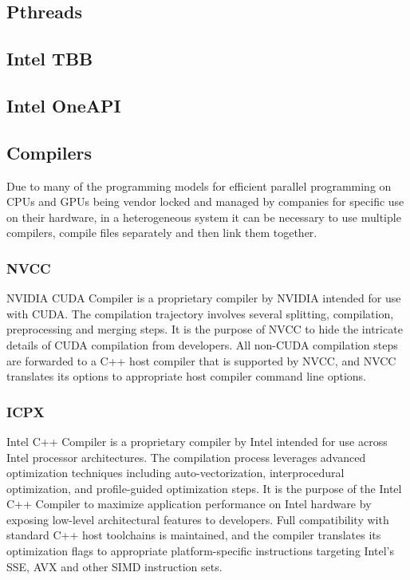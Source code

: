 \documentclass[12pt,a4paper]{article}
\begin{document}
\subsection{Pthreads}

\subsection{Intel TBB}


\subsection{Intel OneAPI}


\subsection{Compilers}

Due to many of the programming models for efficient parallel programming on CPUs and GPUs
being vendor locked and managed by companies for specific use on their hardware, in a
heterogeneous system it can be necessary to use multiple compilers, compile files separately and
then link them together.

\subsubsection{NVCC}

NVIDIA CUDA Compiler is a proprietary compiler by NVIDIA intended for use with CUDA. The
compilation trajectory involves several splitting, compilation, preprocessing and merging steps. It is
the purpose of NVCC to hide the intricate details of CUDA compilation from developers. All
non-CUDA compilation steps are forwarded to a C++ host compiler that is supported by NVCC,
and NVCC translates its options to appropriate host compiler command line options. \cite{nvidia_nvcc}

\subsubsection{ICPX}

Intel C++ Compiler is a proprietary compiler by Intel intended for use across Intel processor
architectures. The compilation process leverages advanced optimization techniques including
auto-vectorization, interprocedural optimization, and profile-guided optimization steps. It is the
purpose of the Intel C++ Compiler to maximize application performance on Intel hardware by
exposing low-level architectural features to developers. Full compatibility with standard C++ host
toolchains is maintained, and the compiler translates its optimization flags to appropriate
platform-specific instructions targeting Intel's SSE, AVX and other SIMD instruction sets.
\end{document}
